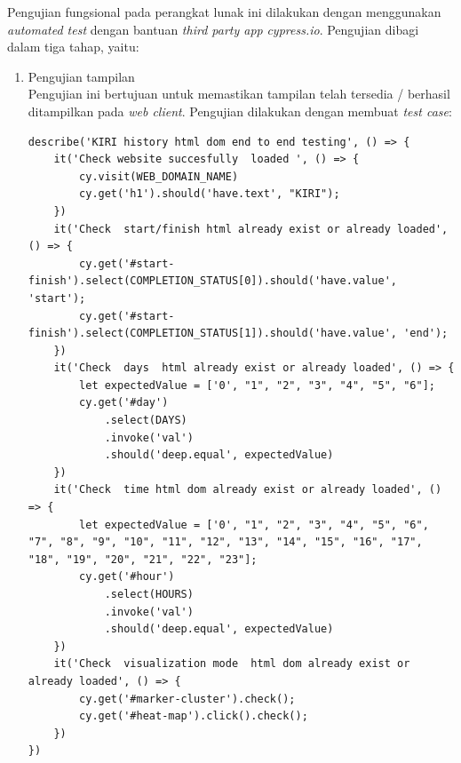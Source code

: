 Pengujian fungsional pada perangkat lunak ini dilakukan dengan menggunakan\textit{ automated test} dengan bantuan \textit{third party app} \textit{cypress.io}. Pengujian dibagi dalam tiga tahap, yaitu:

\begin{enumerate}
    \item Pengujian tampilan\\
    Pengujian ini bertujuan untuk memastikan tampilan telah tersedia / berhasil ditampilkan pada \textit{web client}. Pengujian dilakukan dengan membuat \textit{test case}:\\
    \begin{lstlisting}[label=ui_test_case , caption=UI Test Case]
    describe('KIRI history html dom end to end testing', () => {
    it('Check website succesfully  loaded ', () => {
        cy.visit(WEB_DOMAIN_NAME)
        cy.get('h1').should('have.text', "KIRI");
    })
    it('Check  start/finish html already exist or already loaded', () => {
        cy.get('#start-finish').select(COMPLETION_STATUS[0]).should('have.value', 'start');
        cy.get('#start-finish').select(COMPLETION_STATUS[1]).should('have.value', 'end');
    })
    it('Check  days  html already exist or already loaded', () => {
        let expectedValue = ['0', "1", "2", "3", "4", "5", "6"];
        cy.get('#day')
            .select(DAYS)
            .invoke('val')
            .should('deep.equal', expectedValue)
    })
    it('Check  time html dom already exist or already loaded', () => {
        let expectedValue = ['0', "1", "2", "3", "4", "5", "6", "7", "8", "9", "10", "11", "12", "13", "14", "15", "16", "17", "18", "19", "20", "21", "22", "23"];
        cy.get('#hour')
            .select(HOURS)
            .invoke('val')
            .should('deep.equal', expectedValue)
    })
    it('Check  visualization mode  html dom already exist or already loaded', () => {
        cy.get('#marker-cluster').check();
        cy.get('#heat-map').click().check();
    })
})

    \end{lstlisting}
    

\end{enumerate}
